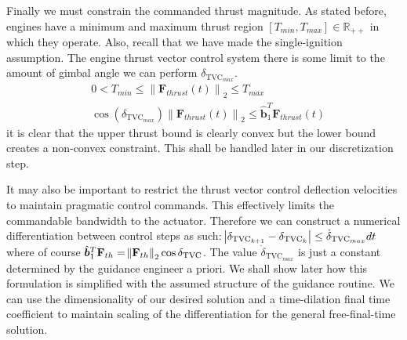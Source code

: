 Finally we must constrain the commanded thrust magnitude. As stated before, engines have a minimum and maximum thrust region $[T_{min}, T_{max}] \in \mathbb{R}_{++}$ in which they operate. Also, recall that we have made the single-ignition assumption. The engine thrust vector control system there is some limit to the amount of gimbal angle we can perform $\delta_{\text{TVC}_{max}}$.
\begin{align}
& 0 < T_{min} \leq \left \lVert \bm{F}_{thrust}(t) \right \lVert_2 \leq T_{max} \\
& \cos(\delta_{\text{TVC}_{max}}) \left \lVert \bm{F}_{thrust}(t) \right \lVert_2 \leq \hat{\bm{b}}_1^T \bm{F}_{thrust}(t)
\end{align}
it is clear that the upper thrust bound is clearly convex but the lower bound creates a non-convex constraint. This shall be handled later in our discretization step.

It may also be important to restrict the thrust vector control deflection velocities to maintain pragmatic control commands. This effectively limits the commandable bandwidth to the actuator. Therefore we can construct a numerical differentiation between control steps as such: $\abs{\delta_{\text{TVC}_{k+1}} - \delta_{\text{TVC}_{k}}} \leq \dot{\delta}_{\text{TVC}_{max}}dt$ where of course $\hat{\bm{b}}_1^T\mathbf{F}_{th} = \norm{\mathbf{F}_{th}}_2\cos{\delta_{\text{TVC}}}$. The value $\dot{\delta}_{\text{TVC}_{max}}$ is just a constant determined by the guidance engineer a priori. We shall show later how this formulation is simplified with the assumed structure of the guidance routine. We can use the dimensionality of our desired solution and a time-dilation final time coefficient to maintain scaling of the differentiation for the general free-final-time solution.


%
